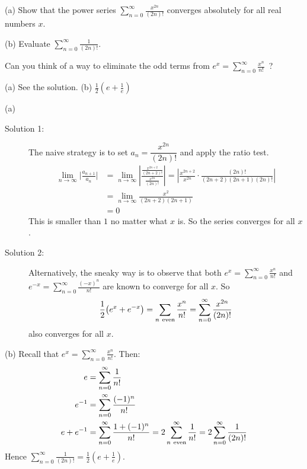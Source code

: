 


\begin{Mquestion}[M121 2000A]\label{prob_s3.6evaluate2}
(a) Show that the power series
$\displaystyle\sum_{n=0}^\infty \frac{x^{2n}}{(2n)!}$
converges absolutely for all real numbers $x$.

\noindent (b)  Evaluate $\displaystyle\sum_{n=0}^\infty \frac{1}{(2n)!}$.
\end{Mquestion}

\begin{hint}
Can you think of a way to eliminate the odd terms from
$e^x=\displaystyle \sum_{n=0}^\infty \frac{x^n}{n!}$\ ?
\end{hint}

\begin{answer}
(a) See the solution.\qquad
(b) $\displaystyle\frac12\left(e+\frac{1}{e}\right)$
\end{answer}

\begin{solution}
(a)
\begin{description}
\item[Solution 1:] The naive strategy is to set $a_n=\dfrac{x^{2n}}{(2n)!}$ and apply
the ratio test.
\begin{align*}
\lim_{n\rightarrow\infty}\Big|\frac{a_{n+1}}{a_n}\Big|
&=\lim_{n\rightarrow\infty}
   \left|\frac{ \frac{x^{2n+2}}{(2n+2)!}  }
                  {\frac{x^{2n}}{(2n)!}}\right| =\left|
                  \frac{x^{2n+2}}{x^{2n}}\cdot \frac{(2n)!}{(2n+2)(2n+1)(2n)!}
                  \right|\\
&=\lim_{n\rightarrow\infty}  \frac{x^2}{(2n+2)(2n+1)}
\\
&=0
\end{align*}
This is smaller than $1$ no matter what $x$ is.
So the series converges for all $x$.

\item[Solution 2:] Alternatively, the sneaky way is to observe that both
$e^x=\displaystyle \sum_{n=0}^\infty \frac{x^n}{n!}$
and
$e^{-x}=\displaystyle \sum_{n=0}^\infty \frac{(-x)^n}{n!}$
are known to converge for all $x$. So
\begin{equation*}
\frac{1}{2}\big(e^x+e^{-x}\big)
= \sum_{{n{\rm\ even}}}\frac{x^n}{n!}
= \sum_{n=0}^\infty \frac{x^{2n}}{(2n)!}
\end{equation*}
also converges for all $x$.
\end{description}
\noindent (b)
Recall that $e^x=\displaystyle\sum\limits_{n=0}^\infty \frac{x^n}{n!}$. Then:
\begin{align*}
e&=\sum\limits_{n=0}^\infty \frac{1}{n!}\cr
e^{-1}&=\sum_{n=0}^\infty \frac{(-1)^n}{n!}\\
e+e^{-1}&=\sum_{n=0}^\infty \frac{1+(-1)^n}{n!}
=2\sum_{n{\rm\ even}}^\infty \frac{1}{n!}
=2\sum_{n=0}^\infty \frac{1}{(2n)!}
\end{align*}
Hence $\displaystyle\sum\limits_{n=0}^\infty \frac{1}{(2n)!}=\frac12\left(e+\frac{1}{e}\right)$.
\end{solution}


